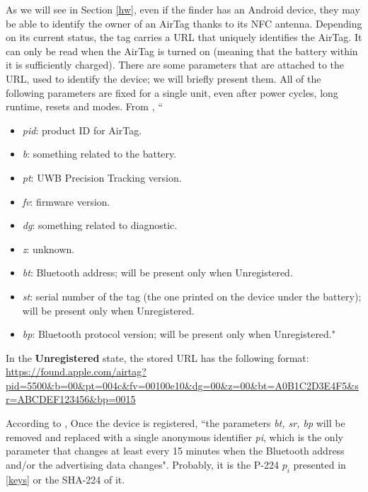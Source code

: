 \documentclass[english]{article}
\begin{document}
As we will see in Section \ref{hw}, even if the finder has an Android device, they may be able to identify the owner of an AirTag thanks to its NFC antenna. Depending on its current status, the tag carries a URL that uniquely identifies the AirTag. It can only be read when the AirTag is turned on (meaning that the battery within it is sufficiently charged). There are some parameters that are attached to the URL, used to identify the device; we will briefly present them. All of the following parameters are fixed for a single unit, even after power cycles, long runtime, resets and modes. From \cite{reverse}, ``
\begin{itemize}
  \item \textit{pid}: product ID for AirTag.
  \item \textit{b}: something related to the battery.
  \item \textit{pt}: UWB Precision Tracking version.
  \item \textit{fv}: firmware version.
  \item \textit{dg}: something related to diagnostic.
  \item \textit{z}: unknown.
  \item \textit{bt}: Bluetooth address; will be present only when Unregistered.
  \item \textit{st}: serial number of the tag (the one printed on the device under the battery); will be present only when Unregistered.
  \item \textit{bp}: Bluetooth protocol version; will be present only when Unregistered."
\end{itemize}
In the \textbf{Unregistered} state, the stored URL has the following format:
\url{https://found.apple.com/airtag?pid=5500&b=00&pt=004c&fv=00100e10&dg=00&z=00&bt=A0B1C2D3E4F5&sr=ABCDEF123456&bp=0015}

According to \cite{reverse},
Once the device is registered, ``the parameters \textit{bt, sr, bp} will be removed and replaced with a single anonymous identifier \textit{pi}, which is the only parameter that changes at least every 15 minutes when the Bluetooth address and/or the advertising data changes". Probably, it is the P-224 $p_i$ presented in \ref{keys} or the SHA-224 of it. 
\end{document}
